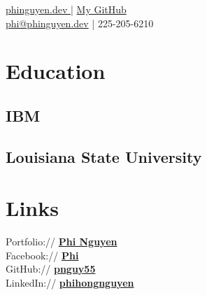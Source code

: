 \documentclass[]{deedy-resume-openfont}
\begin{document}
%
%
\lastupdated

%
%
{ \href{https://phinguyen.dev}{phinguyen.dev }| \href{https://github.com/pnguy55}{ My GitHub}\\
\href{mailto:phi@phinguyen.dev}{phi@phinguyen.dev} | 225-205-6210
}

%
%

\begin{minipage}[t]{0.33\textwidth} 


\section{Education} 

\subsection{IBM}
\sectionsep

\subsection{Louisiana State University}
\sectionsep



\section{Links} 
Portfolio:// \href{https://phinguyen.dev}{\bf Phi Nguyen} \\
Facebook:// \href{https://facebook/dd}{\bf Phi} \\
GitHub:// \href{https://github.com/pnguy55}{\bf pnguy55}\\
LinkedIn://  \href{https://www.linkedin.com/in/debarghyadas}{\bf phihongnguyen} \\

\end{minipage}
\end{document}
